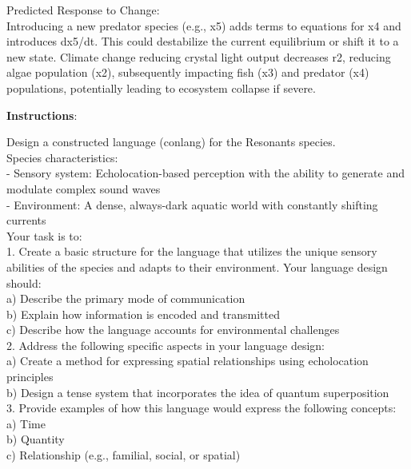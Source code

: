 \begin{tcolorbox}[breakable,boxrule=0.5pt,sharp corners,fontupper=\small,
colback=green!10, colframe=green!50!black, title={Success: Mathematical Model of Subterranean Crystal Caves}]
Predicted Response to Change:\\
Introducing a new predator species (e.g., x5) adds terms to equations for x4 and introduces dx5/dt. This could destabilize the current equilibrium or shift it to a new state. Climate change reducing crystal light output decreases r2, reducing algae population (x2), subsequently impacting fish (x3) and predator (x4) populations, potentially leading to ecosystem collapse if severe.
\end{tcolorbox}

\begin{tcolorbox}[breakable,boxrule=0.5pt,sharp corners,fontupper=\small,
colback=green!10, colframe=green!50!black, title={Success: A Xenolinguistic Conlang for Resonants}]
\textbf{Instructions}: 

Design a constructed language (conlang) for the Resonants species.\\

Species characteristics:\\
- Sensory system: Echolocation-based perception with the ability to generate and modulate complex sound waves\\
- Environment: A dense, always-dark aquatic world with constantly shifting currents\\

Your task is to:\\

1. Create a basic structure for the language that utilizes the unique sensory abilities of the species and adapts to their environment. Your language design should:\\
   a) Describe the primary mode of communication\\
   b) Explain how information is encoded and transmitted\\
   c) Describe how the language accounts for environmental challenges\\

2. Address the following specific aspects in your language design:\\
   a) Create a method for expressing spatial relationships using echolocation principles\\
   b) Design a tense system that incorporates the idea of quantum superposition\\

3. Provide examples of how this language would express the following concepts:\\
   a) Time\\
   b) Quantity\\
   c) Relationship (e.g., familial, social, or spatial)\\


\end{tcolorbox}
